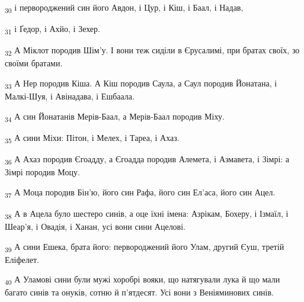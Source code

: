 \begin{tcolorbox}
\textsubscript{30} і первороджений син його Авдон, і Цур, і Кіш, і Баал, і Надав,
\end{tcolorbox}
\begin{tcolorbox}
\textsubscript{31} і Ґедор, і Ахйо, і Зехер.
\end{tcolorbox}
\begin{tcolorbox}
\textsubscript{32} А Міклот породив Шім'у. І вони теж сиділи в Єрусалимі, при братах своїх, зо своїми братами.
\end{tcolorbox}
\begin{tcolorbox}
\textsubscript{33} А Нер породив Кіша. А Кіш породив Саула, а Саул породив Йонатана, і Малкі-Шуя, і Авінадава, і Ешбаала.
\end{tcolorbox}
\begin{tcolorbox}
\textsubscript{34} А син Йонатанів Мерів-Баал, а Мерів-Баал породив Міху.
\end{tcolorbox}
\begin{tcolorbox}
\textsubscript{35} А сини Міхи: Пітон, і Мелех, і Тареа, і Ахаз.
\end{tcolorbox}
\begin{tcolorbox}
\textsubscript{36} А Ахаз породив Єгоадду, а Єгоадда породив Алемета, і Азмавета, і Зімрі: а Зімрі породив Моцу.
\end{tcolorbox}
\begin{tcolorbox}
\textsubscript{37} А Моца породив Бін'ю, його син Рафа, його син Ел'аса, його син Ацел.
\end{tcolorbox}
\begin{tcolorbox}
\textsubscript{38} А в Ацела було шестеро синів, а оце їхні імена: Азрікам, Бохеру, і Ізмаїл, і Шеар'я, і Овадія, і Ханан, усі вони сини Ацелові.
\end{tcolorbox}
\begin{tcolorbox}
\textsubscript{39} А сини Ешека, брата його: первороджений його Улам, другий Єуш, третій Еліфелет.
\end{tcolorbox}
\begin{tcolorbox}
\textsubscript{40} А Уламові сини були мужі хоробрі вояки, що натягували лука й що мали багато синів та онуків, сотню й п'ятдесят. Усі вони з Веніяминових синів.
\end{tcolorbox}
